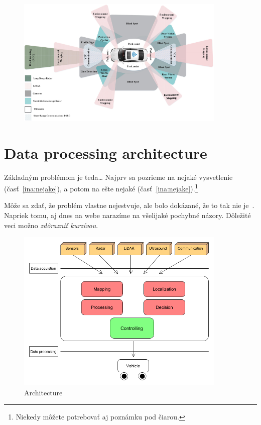 \documentclass[10pt,oneside,english,a4paper]{article}
\begin{document}
\begin{figure}
\centering
    \includegraphics[width=10cm]{sensors.png}
    \caption{}
    \label{fig:sensors}
    
\end{figure}

\section{Data processing architecture} \label{architecture}

Základným problémom je teda\ldots{} Najprv sa pozrieme na nejaké vysvetlenie (časť~\ref{ina:nejake}), a potom na ešte nejaké (časť~\ref{ina:nejake}).\footnote{Niekedy môžete potrebovať aj poznámku pod čiarou.}

Môže sa zdať, že problém vlastne nejestvuje\cite{}, ale bolo dokázané, že to tak nie je~\cite{}. Napriek tomu, aj dnes na webe narazíme na všelijaké pochybné názory\cite{}. Dôležité veci možno \emph{zdôrazniť kurzívou}.

\begin{figure}


\centering
    \includegraphics[width=10cm]{architecture.png}
    \caption{Architecture}
    \label{fig:architecture}

\end{figure}
\end{document}
